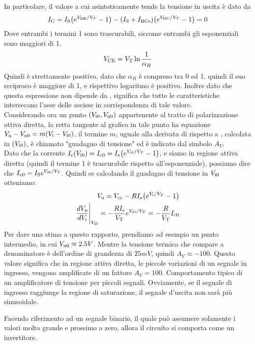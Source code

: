 \documentclass[../elettronica]{subfiles}
\begin{document}
\noindent
In particolare, il valore a cui asintoticamente tende la tensione in uscita è dato da
\[
I_{\text{C}} = I_{\text{S}} \big(e^{V_{\text{BE}}/V_T} -1\big) - (I_{\text{S}} + I_{\text{BCs}}) \big(e^{V_{\text{BC}}/V_T} -1\big) = 0
\]
Dove entrambi i termini 1 sono trascurabili, siccome entrambi gli esponenziali sono maggiori di 1.
\[
V_{\text{CE}}  = V_{\text{T}} \ln{\frac{1}{\alpha_R}}
\]
Quindi \vce è strettamente positivo, dato che $\alpha_R$ è compreso tra 0 ed 1, quindi il suo reciproco è maggiore di 1, e
rispettivo logaritmo è positivo.
Inoltre dato che questa espressione non dipende da \vbe, significa che tutte le caratteristiche intersecano l'asse delle ascisse
in corrispondenza di tale valore.
\\[10pt]
Considerando ora un punto $(V_{\text{i0}}, V_{\text{u0}})$ appartenente al tratto di polarizzazione attiva diretta,
la retta tangente al grafico in tale punto ha equazione $V_{\text{u}} - V_{\text{u0}} = m (V_{\text{i}} - V_{\text{i0}})$, il termine $m$, uguale alla derivata
di \vu rispetto a \vi, calcolata in $(V_{\text{i0}})$, è chiamato "guadagno di tensione" ed è indicato dal simbolo $A_V$.
\\[10pt]
Dato che la corrente $I_{\text{c}}(V_{\text{i0}}) = I_{\text{c0}} = I_s \big(e^{V_{\text{i0}}/V_T} -1\big)$, e siamo in regione attiva diretta (quindi il termine 1
è trascurabile rispetto all'esponenziale), possiamo dire che $I_{\text{c0}} = I_{\text{S}}e^{V_{\text{i0}}/V_{\text{T}}}$.
Quindi se calcolando il guadagno di tensione in $V_{\text{i0}}$ otteniamo:
\begin{align*}
    V_{\text{u}} = V_{\text{cc}} - RI_s \big(e^{V_{\text{i}}/V_T} -1\big)\\
    \frac{dV_{\text{u}}}{dV_{\text{i}}}\Bigg|_{V_{\text{i0}}} = -\frac{R I_{\text{s}}}{V_{\text{T}}}e^{V_{\text{i0}}/V_{\text{T}}}
    = -\frac{R}{V_{\text{T}}} I_{\text{c0}}
\end{align*}
Per dare una stima a questo rapporto, prendiamo ad esempio un punto intermedio, in cui $V_{\text{u0}} \approx 2.5 V$. Mentre la tensione termica
 che compare a denominatore è dell'ordine di grandezza di $25 mV$, quindi $A_V \approx -100$.
Questo valore significa che in regione attiva diretta, le piccole variazioni di un segnale in ingresso, vengono amplificate di
un fattore $A_V = 100$. Comportamento tipico di un amplificatore di tensione per piccoli segnali.
Ovviamente, se il segnale di ingresso raggiunge la regione di saturazione, il segnale d'uscita non sarà più sinusoidale.

Facendo riferimento ad un segnale binario, il quale può assumere solamente i valori \vh molto grande e \vl prossimo a zero, allora
il circuito si comporta come un invertitore.

\newpage
\end{document}
